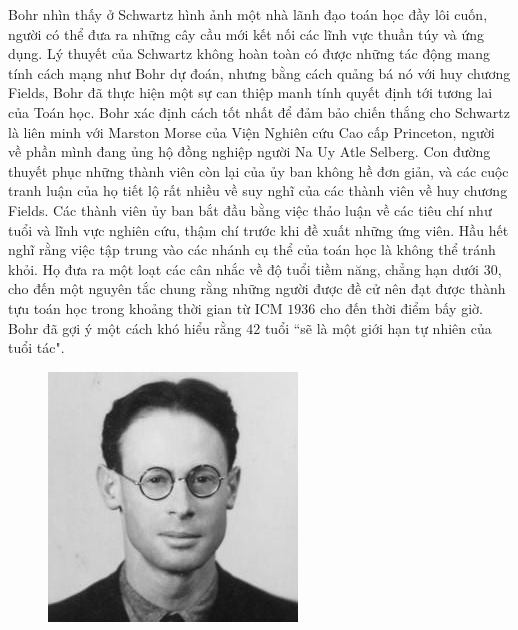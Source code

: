 \begin{multicols}{2}
	\vskip 0.1cm
	Bohr nhìn thấy ở Schwartz hình ảnh một nhà lãnh đạo toán học đầy lôi cuốn, người có thể đưa ra những cây cầu mới kết nối các lĩnh vực thuần túy và ứng dụng. Lý thuyết của Schwartz không hoàn toàn có được những tác động mang tính cách mạng như Bohr dự đoán, nhưng bằng cách quảng bá nó với huy chương Fields, Bohr đã thực hiện một sự can thiệp manh tính quyết định tới tương lai của Toán học.
	\vskip 0.1cm
	Bohr xác định cách tốt nhất để đảm bảo chiến thắng cho Schwartz là liên minh với Marston Morse của Viện Nghiên cứu Cao cấp Princeton, người về phần mình đang ủng hộ đồng nghiệp người Na Uy Atle Selberg. Con đường thuyết phục những thành viên còn lại của ủy ban không hề đơn giản, và các cuộc tranh luận của họ tiết lộ rất nhiều về suy nghĩ của các thành viên về huy chương Fields.
	\vskip 0.1cm
	Các thành viên ủy ban bắt đầu bằng việc thảo luận về các tiêu chí như tuổi và lĩnh vực nghiên cứu, thậm chí trước khi đề xuất những ứng viên. Hầu hết nghĩ rằng việc tập trung vào các nhánh cụ thể của toán học là không thể tránh khỏi. Họ đưa ra một loạt các cân nhắc về độ tuổi tiềm năng, chẳng hạn dưới $30$, cho đến một nguyên tắc chung rằng những người được đề cử nên đạt được thành tựu toán học trong khoảng thời gian từ ICM $1936$ cho đến thời điểm bấy giờ. Bohr đã gợi ý một cách khó hiểu rằng $42$ tuổi ``sẽ là một giới hạn tự nhiên của tuổi tác".
	\begin{figure}[H]
		\vspace*{-5pt}
		\centering
		\captionsetup{labelformat= empty, justification=centering}
		\includegraphics[width= 0.85\linewidth]{AndreWeil}

\end{figure}
\end{multicols}
